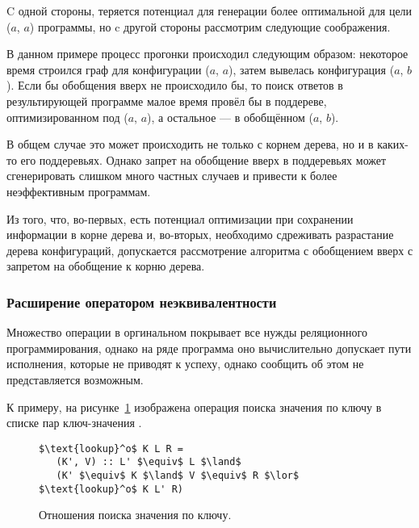 C одной стороны, теряется потенциал для генерации более оптимальной для цели ($a$, $a$)
программы, но c другой стороны рассмотрим следующие соображения.

В данном примере процесс прогонки происходил следующим образом: некоторое время строился
граф для конфигурации ($a$, $a$), затем вывелась конфигурация ($a$, $b$).
Если бы обобщения вверх не происходило бы, то поиск ответов в результирующей программе
малое время провёл бы в поддереве, оптимизированном под ($a$, $a$), а остальное --- в обобщённом
($a$, $b$).

В общем случае это может происходить не только с корнем дерева, но и в каких-то его поддеревьях.
Однако запрет на обобщение вверх в поддеревьях может сгенерировать слишком много частных случаев
и привести к более неэффективным программам.

Из того, что, во-первых, есть потенциал оптимизации при сохранении информации в корне дерева и,
во-вторых, необходимо сдреживать разрастание дерева конфигураций,
допускается рассмотрение алгоритма с обобщением вверх с запретом на обобщение к корню дерева.


\subsubsection{Расширение \ukanren оператором неэквивалентности}

Множество операции в оргинальном \ukanren покрывает все нужды реляционного программирования,
однако на ряде программа оно вычислительно допускает пути исполнения, которые не приводят
к успеху, однако сообщить об этом не представляется возможным.

К примеру, на рисунке~\ref{fig:lookup} изображена операция поиска значения по ключу
в списке пар ключ-значения .

\begin{figure}[h!]
\begin{lstlisting}
$\text{lookup}^o$ K L R =
   (K', V) :: L' $\equiv$ L $\land$
   (K' $\equiv$ K $\land$ V $\equiv$ R $\lor$ $\text{lookup}^o$ K L' R)
\end{lstlisting}
\caption{Отношения поиска значения по ключу.}
\label{fig:lookup}
\end{figure}

